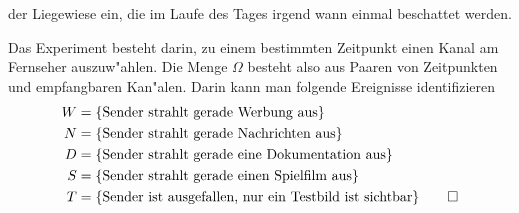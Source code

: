 \begin{loesung}
\begin{teilaufgaben}
der Liegewiese ein, die im Laufe des Tages irgend wann einmal beschattet 
werden.
\item 
Das Experiment besteht darin, zu einem bestimmten Zeitpunkt
einen Kanal am Fernseher auszuw"ahlen.
Die Menge $\Omega$ besteht also aus Paaren von Zeitpunkten und
empfangbaren Kan"alen.
Darin kann man folgende Ereignisse identifizieren
\begin{align*}
W&=\{\text{Sender strahlt gerade Werbung aus}\}\\
N&=\{\text{Sender strahlt gerade Nachrichten aus}\}\\
D&=\{\text{Sender strahlt gerade eine Dokumentation aus}\}\\
S&=\{\text{Sender strahlt gerade einen Spielfilm aus}\}\\
T&=\{\text{Sender ist ausgefallen, nur ein Testbild ist sichtbar}\}
\qedhere
\end{align*}
\end{teilaufgaben}
\end{loesung}


